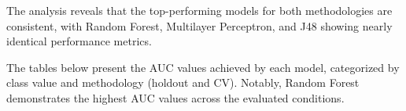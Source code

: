 The analysis reveals that the top-performing models for both methodologies are consistent, with Random Forest, Multilayer Perceptron, and J48 showing nearly identical performance metrics. 

The tables below present the AUC values achieved by each model, categorized by class value and methodology (holdout and CV). Notably, Random Forest demonstrates the highest AUC values across the evaluated conditions. 

\begin{table}[H]
\centering
{}
\caption{Area Under Curve for Star class (MultiClassClassifier node)}
\label{tab:star_auc}
\end{table}



